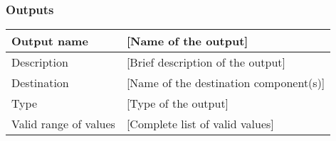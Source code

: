 \subsubsection{Outputs}

\begin{longtable}{p{}p{}}
\toprule
Output name				& [Name of the output] \\
\midrule
Description				& [Brief description of the output] \\
\midrule
Destination				& [Name of the destination component(s)] \\ 
\midrule
Type					& [Type of the output] \\
\midrule
Valid range of values	& [Complete list of valid values] \\
\bottomrule
\end{longtable}
